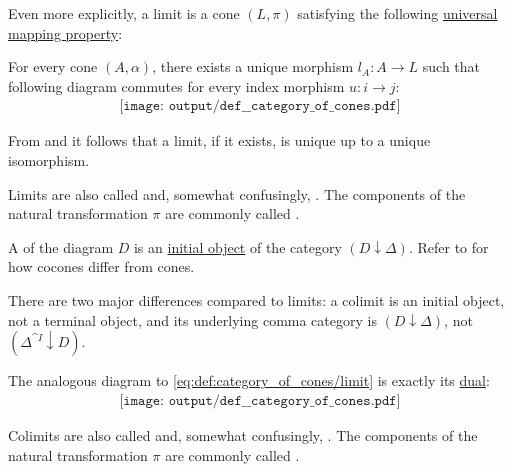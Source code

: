 \begin{definition}
\begin{thmenum}
    Even more explicitly, a limit is a cone \( (L, \pi) \) satisfying the following \hyperref[rem:universal_mapping_property]{universal mapping property}:
    \begin{displayquote}
      For every cone \( (A, \alpha) \), there exists a unique morphism \( l_A: A \to L \) such that following diagram commutes for every index morphism \( u: i \to j \):
      \begin{equation}\label{eq:def:category_of_cones/limit}
        \begin{aligned}
          \texttt{[image: output/def\_\_category\_of\_cones.pdf]}
        \end{aligned}
      \end{equation}
    \end{displayquote}

    From  and  it follows that a limit, if it exists, is unique up to a unique isomorphism.

    Limits are also called  and, somewhat confusingly, . The components of the natural transformation \( \pi \) are commonly called .

     A  of the diagram \( D \) is an \hyperref[def:universal_objects/initial]{initial object} of the  category \( (D \downarrow \Delta) \). Refer to  for how cocones differ from cones.

    There are two major differences compared to limits: a colimit is an initial object, not a terminal object, and its underlying comma category is \( (D \downarrow \Delta) \), not \( (\Delta^{\cat{I}} \downarrow D) \).

    The analogous diagram to \eqref{eq:def:category_of_cones/limit} is exactly its \hyperref[rem:categorical_principle_of_duality]{dual}:
    \begin{equation}\label{eq:def:category_of_cones/colimit}
      \begin{aligned}
        \texttt{[image: output/def\_\_category\_of\_cones.pdf]}
      \end{aligned}
    \end{equation}

    Colimits are also called  and, somewhat confusingly, . The components of the natural transformation \( \pi \) are commonly called .
  \end{thmenum}
\end{definition}

